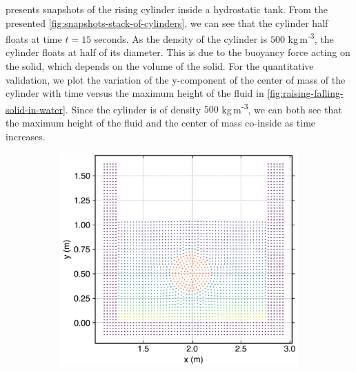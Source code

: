  presents snapshots of the rising
cylinder inside a hydrostatic tank. From the presented
\cref{fig:snapshots-stack-of-cylinders}, we can see that the cylinder half
floats at time $t = 15$ seconds. As the density of the cylinder is $500$
kg\,m\textsuperscript{-3}, the cylinder floats at half of its diameter. This is due
to the buoyancy force acting on the solid, which depends on the volume of the
solid. For the quantitative validation, we plot the variation of the y-component of
the center of mass of the cylinder with time versus the maximum height of the
fluid in \cref{fig:raising-falling-solid-in-water}. Since the cylinder is of
density $500$ kg\,m\textsuperscript{-3}, we can both see that the maximum height of the fluid
and the center of mass co-inside as time increases.
\begin{figure}[!htpb]
  \centering
  \begin{subfigure}{0.48\textwidth}
    \centering
    \includegraphics[width=1.0\textwidth]{figures/rfc/figures/dinesh_2022_body_in_hs_tank_2d/time1}
  \end{subfigure}
  \begin{subfigure}{0.48\textwidth}
    \centering

\end{subfigure}
\end{figure}
